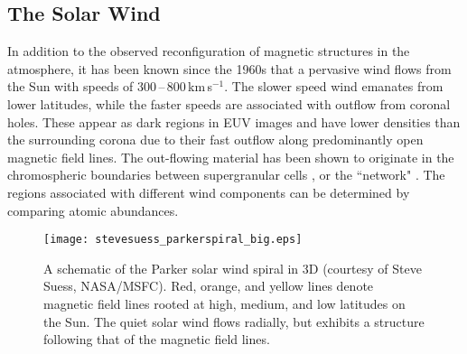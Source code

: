 
\subsection{The Solar Wind}\label{sect:solarwind}


In addition to the observed reconfiguration of magnetic structures in the atmosphere, it has been known since the 1960s that a pervasive wind flows from the Sun with speeds of 300\,--\,800\,km\,s$^{-1}$. The slower speed wind emanates from lower latitudes, while the faster speeds are associated with outflow from coronal holes. These appear as dark regions in \gls{EUV} images and have lower densities than the surrounding corona due to their fast outflow along predominantly open magnetic field lines. The out-flowing material has been shown to originate in the chromospheric boundaries between supergranular cells \citep{Hassler:1999}, or the ``network" \citep{Gallagher:1998}. The regions associated with different wind components can be determined by comparing atomic abundances. 

\begin{figure}[!t]
\centerline{\texttt{[image: stevesuess\_parkerspiral\_big.eps]}}
\caption[A schematic of the Parker solar wind spiral in 3D.]{A schematic of the Parker solar wind spiral in 3D (courtesy of Steve Suess, NASA/MSFC). Red, orange, and yellow lines denote magnetic field lines rooted at high, medium, and low latitudes on the Sun. The quiet solar wind flows radially, but exhibits a structure following that of the magnetic field lines.}
\label{fig:parkspiral}
\end{figure}

